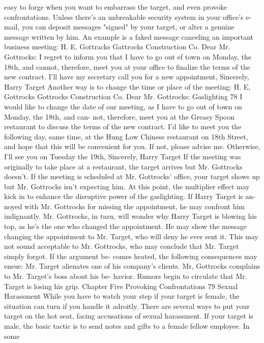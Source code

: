 \documentclass{book}
\begin{document}
easy to forge when you want to embarrass the target, and even 
provoke confrontations. Unless there's an unbreakable security 
system in your office's e-mail, you can deposit messages 
"signed" by your target, or alter a genuine message written by 
him. 
An example is a faked message canceling an important 
business meeting: 
H. E. Gottracks 
Gattrocks Construction Co. 
Dear Mr. Gottrocks: 
I regret to inform you that I have to go out ef town 
on Monday, the 18th, and cannot, therefore, meet you 
at your office to finalize the terms of the new contract. 
I'll have my secretary call you for a new appointment, 
Sincerely, 
Harry Target 
Another way is to change the time or place of the meeting: 
H. E, Gottrocks 
Gottrocks Construction Co. 
Dear Mr. Gottrocks:  Gaslighting 
78 
I would like to change the date of our meeting, as I 
have to go out of town on Monday, the 18th, and can- 
not, therefore, meet you at the Greasy Spoon restaurant 
to discuss the terms of the new contract. I'd like to meet 
you the following day, same time, at the Hung Low 
Chinese restaurant on 18th Street, and hope that this 
will be convenient for you. If not, please advise me. 
Otherwise, I'll see you on Tuesday the 19th, 
Sincerely, 
Harry Target 
If the meeting was originally to take place at a restaurant, 
the target arrives but Mr. Gottrocks doesn't. If the meeting is 
scheduled at Mr. Gottrocks' office, your target shows up but 
Mr. Gottrocks isn't expecting him. 
At this point, the multiplier effect may kick in to enhance 
the disruptive power of the gaslighting. If Harry Target is an- 
noyed with Mr. Gottrocks for missing the appointment, he may 
confront him indignantly. Mr. Gottrocks, in turn, will wonder 
why Harry Target is blowing his top, as he’s the one who 
changed the appointment. He may show the message changing 
the appointment to Mr. Target, who will deny he ever sent it. 
This may not sound acceptable to Mr. Gottrocks, who may 
conclude that Mr. Target simply forgot. If the argument be- 
comes heated, the following consequences may ensue: 
Mr. Target alienates one of his company's clients. 
Mr, Gottrocks complains to Mr. Target's boss about his be- 
havior. 
Rumors begin to circulate that Mr. Target is losing his grip. 
Chapter Five 
Provoking Confrontations 
79 
Sexual Harassment 
While you have to watch your step if your target is female, 
the situation can turn if you handle it adroitly. There are several 
ways to put your target on the hot seat, facing accusations of 
sexual harassment. If your target is male, the basic tactic is to 
send notes and gifts to a female fellow employee. In some 
\end{document}
